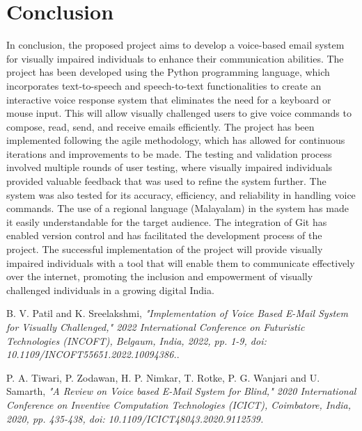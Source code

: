 \documentclass[12pt]{report}
\begin{document}
\chapter{Conclusion}
In conclusion, the proposed project aims to develop a voice-based email system for visually impaired individuals to enhance their communication abilities. The project has been developed using the Python programming language, which incorporates text-to-speech and speech-to-text functionalities to create an interactive voice response system that eliminates the need for a keyboard or mouse input. This will allow visually challenged users to give voice commands to compose, read, send, and receive emails efficiently.\newline \newline
The project has been implemented following the agile methodology, which has allowed for continuous iterations and improvements to be made. The testing and validation process involved multiple rounds of user testing, where visually impaired individuals provided valuable feedback that was used to refine the system further. The system was also tested for its accuracy, efficiency, and reliability in handling voice commands.\newline \newline
The use of a regional language (Malayalam) in the system has made it easily understandable for the target audience. The integration of Git has enabled version control and has facilitated the development process of the project. The successful implementation of the project will provide visually impaired individuals with a tool that will enable them to communicate effectively over the internet, promoting the inclusion and empowerment of visually challenged individuals in a growing digital India.

\begin{thebibliography}{9}
B. V. Patil and K. Sreelakshmi, 
\textit{"Implementation of Voice Based E-Mail System for Visually Challenged," 2022 International Conference on Futuristic Technologies (INCOFT), Belgaum, India, 2022, pp. 1-9, doi: 10.1109/INCOFT55651.2022.10094386.}.

 
P. A. Tiwari, P. Zodawan, H. P. Nimkar, T. Rotke, P. G. Wanjari and U. Samarth,
\textit{"A Review on Voice based E-Mail System for Blind," 2020 International Conference on Inventive Computation Technologies (ICICT), Coimbatore, India, 2020, pp. 435-438, doi: 10.1109/ICICT48043.2020.9112539.} 
 
\end{thebibliography}
\end{document}
